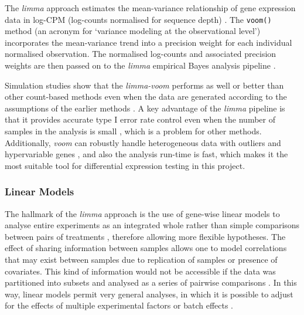         The \textit{limma} approach estimates the mean-variance relationship of gene expression data in log-CPM  (log-counts normalised for sequence depth) \cite{Law2014}. The \texttt{voom()} method (an acronym for ‘variance modeling at the observational level’) incorporates the mean-variance trend into a precision weight for each individual normalised observation. The normalised log-counts and associated precision weights are then passed on to the \textit{limma} empirical Bayes analysis pipeline \cite{Law2014}.
        
        Simulation studies show that the \textit{limma-voom} performs as well or better than other count-based methods even when the data are generated according to the assumptions of the earlier methods  \cite{Law2014}. A key advantage of the \textit{limma} pipeline is that it provides accurate type I error rate control even when the number of samples in the analysis is small \cite{SmythLimma:Guide}, which is a problem for other methods. Additionally, \textit{voom} can robustly handle heterogeneous data with outliers and hypervariable genes \cite{phipson2013empirical}, and also the analysis run-time is fast, which makes it the most suitable tool for differential expression testing in this project. 
        
        \subsubsection{Linear Models}
        
        The hallmark of the \textit{limma} approach is the use of gene-wise linear models to analyse entire experiments as an integrated whole rather than simple comparisons between pairs of treatments  \cite{Ritchie2015LimmaStudies}, therefore allowing more flexible hypotheses. The effect of sharing information between samples allows one to model correlations that may exist between samples due to replication of samples or presence of covariates. This kind of information would not be accessible if the data was partitioned into subsets and analysed as a series of pairwise comparisons \cite{Love2016RNA-SeqApproved}. In this way, linear models permit very general analyses, in which it is possible to adjust for the effects of multiple experimental factors or batch effects  \cite{Ritchie2015LimmaStudies}.
        
